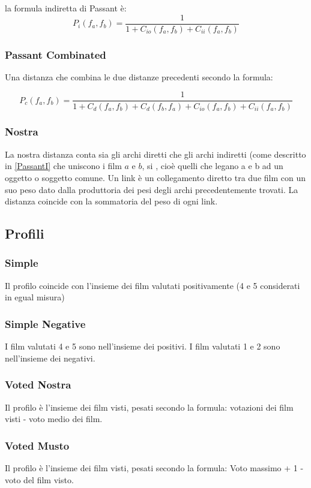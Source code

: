 la formula indiretta di Passant è:
    \begin{equation}
        P_i(f_{a},f_{b}) = \frac{1} {1+C_{io}(f_{a},f_{b})+C_{ii}(f_{a},f_{b})}
    \end{equation}


\subsubsection{Passant Combinated}
Una distanza che combina le due distanze precedenti secondo la formula:

    \begin{equation}
P_{c}(f_{a},f_{b}) = \frac{1} {1+C_{d}(f_{a},f_{b})+C_{d}(f_{b},f_{a})+C_{io}(f_{a},f_{b})+C_{ii}(f_{a},f_{b})}
    \end{equation}


\subsubsection{Nostra}
La nostra distanza conta sia gli archi diretti che gli archi indiretti (come descritto in \ref{PassantI} che uniscono i film $a$ e $b$, si , cioè quelli che legano a e b ad un oggetto o soggetto comune.
Un link è un collegamento diretto tra due film con un suo peso dato dalla produttoria dei pesi degli archi precedentemente trovati.
La distanza coincide con la sommatoria del peso di ogni link.



\subsection{Profili}

\subsubsection{Simple}
Il profilo coincide con l'insieme dei film valutati positivamente (4 e 5 considerati in egual misura)

\subsubsection{Simple Negative}

I film valutati 4 e 5 sono nell'insieme dei positivi. I film valutati 1 e 2 sono nell'insieme dei negativi.


\subsubsection{Voted Nostra}


Il profilo è l'insieme dei film visti, pesati secondo la formula:
votazioni dei film visti - voto medio dei film.

\subsubsection{Voted Musto}

Il profilo è l'insieme dei film visti, pesati secondo la formula:
Voto massimo + 1 - voto del film visto. 

